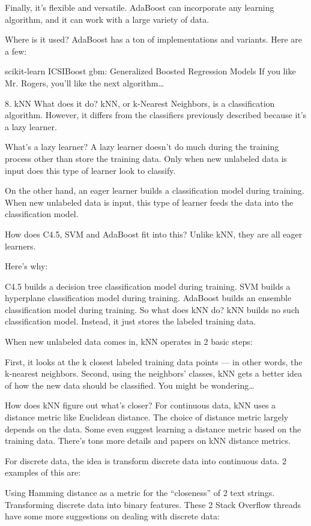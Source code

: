 Finally, it’s flexible and versatile. AdaBoost can incorporate any learning algorithm, and it can work with a large variety of data.

Where is it used? AdaBoost has a ton of implementations and variants. Here are a few:

scikit-learn
ICSIBoost
gbm: Generalized Boosted Regression Models
If you like Mr. Rogers, you’ll like the next algorithm…

8. kNN
What does it do? kNN, or k-Nearest Neighbors, is a classification algorithm. However, it differs from the classifiers previously described because it’s a lazy learner.

What’s a lazy learner? A lazy learner doesn’t do much during the training process other than store the training data. Only when new unlabeled data is input does this type of learner look to classify.

On the other hand, an eager learner builds a classification model during training. When new unlabeled data is input, this type of learner feeds the data into the classification model.

How does C4.5, SVM and AdaBoost fit into this? Unlike kNN, they are all eager learners.

Here’s why:

C4.5 builds a decision tree classification model during training.
SVM builds a hyperplane classification model during training.
AdaBoost builds an ensemble classification model during training.
So what does kNN do? kNN builds no such classification model. Instead, it just stores the labeled training data.

When new unlabeled data comes in, kNN operates in 2 basic steps:

First, it looks at the k closest labeled training data points — in other words, the k-nearest neighbors.
Second, using the neighbors’ classes, kNN gets a better idea of how the new data should be classified.
You might be wondering…

How does kNN figure out what’s closer? For continuous data, kNN uses a distance metric like Euclidean distance. The choice of distance metric largely depends on the data. Some even suggest learning a distance metric based on the training data. There’s tons more details and papers on kNN distance metrics.

For discrete data, the idea is transform discrete data into continuous data. 2 examples of this are:

Using Hamming distance as a metric for the “closeness” of 2 text strings.
Transforming discrete data into binary features.
These 2 Stack Overflow threads have some more suggestions on dealing with discrete data:

